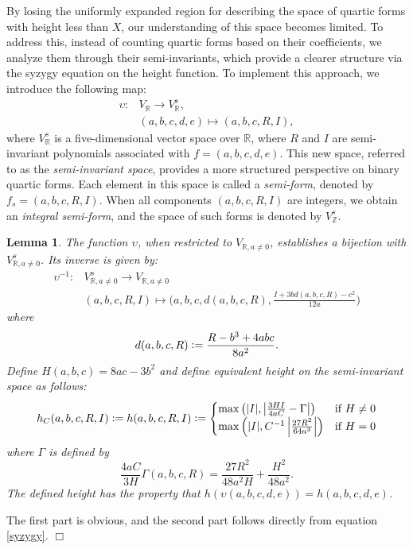 \documentclass{article}
\def\R{{\mathbb R}}
\newtheorem{lemma}[theorem]{Lemma}
\newenvironment{proof}{\noindent {\bf Proof:}}{$\Box$ \vspace{2 ex}}
\def\JR{\frac{27R^2}{48a^2H}+\frac{H^2}{48a^2}}
\begin{document}
By losing the uniformly expanded region for describing the space of quartic forms with height less than $X$, our understanding of this space becomes limited. To address this, instead of counting quartic forms based on their coefficients, we analyze them through their semi-invariants, which provide a clearer structure via the syzygy equation on the height function. To implement this approach, we introduce the following map:
\begin{align*}
    \upsilon\colon &V_{\R} \longrightarrow V_{\R}^s, \\
    &(a, b, c, d, e) \mapsto (a, b, c, R, I),
\end{align*}
where $V_{\mathbb{R}}^s$ is a five-dimensional vector space over $\mathbb{R}$, where $R$ and $I$ are semi-invariant polynomials associated with $f = (a, b, c, d, e)$. This new space, referred to as the \textit{semi-invariant space}, provides a more structured perspective on binary quartic forms. Each element in this space is called a \textit{semi-form}, denoted by $f_s = (a, b, c, R, I)$. When all components $(a, b, c, R, I)$ are integers, we obtain an \textit{integral semi-form}, and the space of such forms is denoted by $V_{\mathbb{Z}}^s$.


\begin{lemma}
The function $\upsilon$, when restricted to $V_{\mathbb{R}, a \neq 0}$, establishes a bijection with $V_{\mathbb{R}, a \neq 0}^s$. Its inverse is given by:
 \begin{align*}
         \upsilon^{-1}\colon & V_{\R,a\neq 0}^{s} \longrightarrow V_{\mathbb{R},a\neq0} \\
          &(a,b,c,R,I) \mapsto \Big(a,b,c,d(a,b,c,R),\frac{I+3bd(a,b,c,R)-c^2}{12a}\Big)  
   \end{align*}
where 
\begin{equation}\label{d}
  d(a,b,c,R) \vcentcolon = \frac{R-b^3+4abc}{8a^2}.
\end{equation}
Define $H(a,b,c)=8ac-3b^2$ and  
define equivalent height on the semi-invariant space as follows:
\begin{equation}\label{height-semi}
h_C(a,b,c,R,I)\vcentcolon=h(a,b,c,R,I) \vcentcolon=
\begin{cases}
\max\left(|I|,  \left| \frac{3HI}{4aC} - \Gamma \right| \right) & \text{if } H \neq 0 \\
\max\left(|I|, C^{-1}\left| \frac{27R^2}{64a^3} \right| \right) & \text{if } H = 0
\end{cases}
\end{equation}
where $\Gamma$ is defined by
\begin{equation*}
    \frac{4aC}{3H}\Gamma(a,b,c,R)  =\JR.
\end{equation*}
 The defined height has the property that $h(\upsilon(a,b,c,d,e))=h(a,b,c,d,e)$.
\end{lemma}
\begin{proof}
   The first part is obvious, and the second part follows directly from equation \eqref{syzygy}.
 \end{proof}
\end{document}
